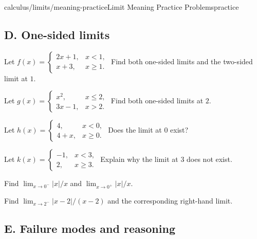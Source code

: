 \begin{webpage}{calculus/limits/meaning-practice}{Limit Meaning Practice Problems}{practice}
\subsection*{D. One-sided limits}

\begin{bgexercises}[label=\textbf{1.\arabic*},resume]
  \item Let \(f(x)=\begin{cases}2x+1,&x<1,\\x+3,&x\ge1.\end{cases}\) Find both one-sided limits and the two-sided limit at \(1\).
  \item Let \(g(x)=\begin{cases}x^2,&x\le2,\\3x-1,&x>2.\end{cases}\) Find both one-sided limits at \(2\).
  \item Let \(h(x)=\begin{cases}4,&x<0,\\4+x,&x\ge0.\end{cases}\) Does the limit at \(0\) exist?
  \item Let \(k(x)=\begin{cases}-1,&x<3,\\2,&x\ge3.\end{cases}\) Explain why the limit at \(3\) does not exist.
  \item Find \(\lim_{x\to0^-}|x|/x\) and \(\lim_{x\to0^+}|x|/x\).
  \item Find \(\lim_{x\to2^-}|x-2|/(x-2)\) and the corresponding right-hand limit.
\end{bgexercises}

\subsection*{E. Failure modes and reasoning}


\end{webpage}
